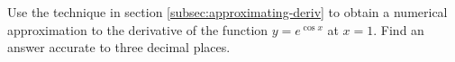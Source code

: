 Use the technique in section \ref{subsec:approximating-deriv} to
obtain a numerical approximation to the derivative of the
function $y=e^{\cos x}$ at $x=1$. Find an answer accurate to
three decimal places.\answercheck
